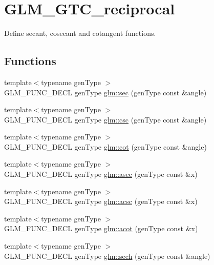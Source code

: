 \hypertarget{group__gtc__reciprocal}{}\section{G\+L\+M\+\_\+\+G\+T\+C\+\_\+reciprocal}
\label{group__gtc__reciprocal}


Define secant, cosecant and cotangent functions.  


\subsection*{Functions}
\begin{DoxyCompactItemize}
\item 
{\footnotesize template$<$typename gen\+Type $>$ }\\G\+L\+M\+\_\+\+F\+U\+N\+C\+\_\+\+D\+E\+C\+L gen\+Type \hyperlink{group__gtc__reciprocal_gabb6829a472da1cc94d88afa6396bed1f}{glm\+::sec} (gen\+Type const \&angle)
\item 
{\footnotesize template$<$typename gen\+Type $>$ }\\G\+L\+M\+\_\+\+F\+U\+N\+C\+\_\+\+D\+E\+C\+L gen\+Type \hyperlink{group__gtc__reciprocal_ga5df75de99f63e854087a06f538907b2c}{glm\+::csc} (gen\+Type const \&angle)
\item 
{\footnotesize template$<$typename gen\+Type $>$ }\\G\+L\+M\+\_\+\+F\+U\+N\+C\+\_\+\+D\+E\+C\+L gen\+Type \hyperlink{group__gtc__reciprocal_ga2f49e28c2634ae1a212e2fc38c42ad42}{glm\+::cot} (gen\+Type const \&angle)
\item 
{\footnotesize template$<$typename gen\+Type $>$ }\\G\+L\+M\+\_\+\+F\+U\+N\+C\+\_\+\+D\+E\+C\+L gen\+Type \hyperlink{group__gtc__reciprocal_gac9761980e09149002a466ca131a4bcac}{glm\+::asec} (gen\+Type const \&x)
\item 
{\footnotesize template$<$typename gen\+Type $>$ }\\G\+L\+M\+\_\+\+F\+U\+N\+C\+\_\+\+D\+E\+C\+L gen\+Type \hyperlink{group__gtc__reciprocal_ga135e8f6b36bb85b5f7d8067e6b890e4d}{glm\+::acsc} (gen\+Type const \&x)
\item 
{\footnotesize template$<$typename gen\+Type $>$ }\\G\+L\+M\+\_\+\+F\+U\+N\+C\+\_\+\+D\+E\+C\+L gen\+Type \hyperlink{group__gtc__reciprocal_ga97d029f989f849b62915b068c264246b}{glm\+::acot} (gen\+Type const \&x)
\item 
{\footnotesize template$<$typename gen\+Type $>$ }\\G\+L\+M\+\_\+\+F\+U\+N\+C\+\_\+\+D\+E\+C\+L gen\+Type \hyperlink{group__gtc__reciprocal_gaaa698b992c63f454a3a1a1baa2773a3c}{glm\+::sech} (gen\+Type const \&angle)

\end{DoxyCompactItemize}
